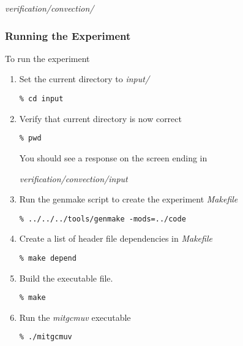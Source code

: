 \vspace{5mm}
{\it verification/convection/ }

\subsubsection{Running the Experiment}

 To run the experiment

\begin{enumerate}
\item Set the current directory to {\it input/ }

\begin{verbatim}
% cd input
\end{verbatim}

\item Verify that current directory is now correct

\begin{verbatim}
% pwd
\end{verbatim}

 You should see a response on the screen ending in

{\it verification/convection/input }


\item Run the genmake script to create the experiment {\it Makefile}

\begin{verbatim}
% ../../../tools/genmake -mods=../code
\end{verbatim}

\item Create a list of header file dependencies in {\it Makefile}

\begin{verbatim}
% make depend
\end{verbatim}

\item Build the executable file.

\begin{verbatim}
% make
\end{verbatim}

\item Run the {\it mitgcmuv} executable

\begin{verbatim}
% ./mitgcmuv
\end{verbatim}

\end{enumerate}


